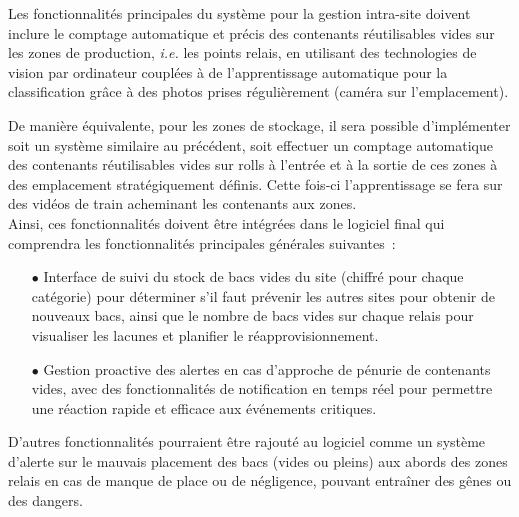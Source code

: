 
Les fonctionnalités principales du système pour la gestion intra-site
doivent inclure le comptage automatique et précis des contenants
réutilisables vides sur les zones de production, \textit{i.e.} les points
relais, en utilisant des technologies de vision par ordinateur
couplées à de l'apprentissage automatique pour la classification grâce
à des photos prises régulièrement (caméra sur l'emplacement).

De manière équivalente, pour les zones de stockage, il sera possible
d'implémenter soit un système similaire au précédent, soit effectuer
un comptage automatique des contenants réutilisables vides sur rolls à
l'entrée et à la sortie de ces zones à des emplacement stratégiquement
définis. Cette fois-ci l'apprentissage se fera sur des vidéos de train
acheminant les contenants aux zones.\\

Ainsi, ces fonctionnalités doivent être intégrées dans le logiciel final
qui comprendra les fonctionnalités principales générales suivantes~:\\

\begin{itemize}
\item[$\bullet$] Interface de suivi du stock de bacs vides du site
  (chiffré pour chaque catégorie) pour déterminer s'il faut prévenir
  les autres sites pour obtenir de nouveaux bacs, ainsi que le nombre
  de bacs vides sur chaque relais pour visualiser les lacunes et
  planifier le réapprovisionnement.
\item[$\bullet$] Gestion proactive des alertes en cas d'approche de
  pénurie de contenants vides, avec des fonctionnalités de
  notification en temps réel pour permettre une réaction rapide et
  efficace aux événements critiques.
\end{itemize}

D'autres fonctionnalités pourraient être rajouté au logiciel comme un
système d'alerte sur le mauvais placement des bacs (vides ou pleins)
aux abords des zones relais en cas de manque de place ou de
négligence, pouvant entraîner des gênes ou des dangers.
